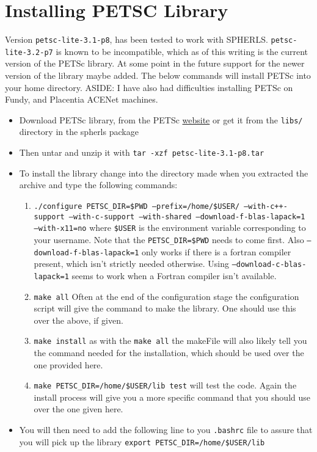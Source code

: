 \documentclass[12pt,a4paper]{book}
\begin{document}
\section{Installing PETSC Library}
Version {\tt petsc-lite-3.1-p8}, has been tested to work with SPHERLS. {\tt petsc-lite-3.2-p7} is known to be incompatible, which as of this writing is the current version of the PETSc library. At some point in the future support for the newer version of the library maybe added. The below commands will install PETSc into your home directory. ASIDE: I have also had difficulties installing PETSc on Fundy, and Placentia ACENet machines.

\begin{itemize}
\item Download PETSc library, from the PETSc \href{http://www.mcs.anl.gov/petsc/download/index.html}{website} or get it from the {\tt libs/} directory in the spherls package
\item Then untar and unzip it with {\tt tar -xzf petsc-lite-3.1-p8.tar}
\item To install the library change into the directory made when you extracted the archive and type the following commands:
\begin{enumerate}
\item {\tt ./configure PETSC\_DIR=\$PWD --prefix=/home/\$USER/ --with-c++-support --with-c-support --with-shared --download-f-blas-lapack=1 --with-x11=no} where {\tt \$USER} is the environment variable corresponding to your username.  Note that the {\tt PETSC\_DIR=\$PWD} needs to come first. Also {\tt --download-f-blas-lapack=1} only works if there is a fortran compiler present, which isn't strictly needed otherwise. Using {\tt --download-c-blas-lapack=1} seems to work when a Fortran compiler isn't available.
\item {\tt make all} Often at the end of the configuration stage the configuration script will give the command to make the library. One should use this over the above, if given.
\item {\tt make install} as with the {\tt make all} the makeFile will also likely tell you the command needed for the installation, which should be used over the one provided here.
\item {\tt make PETSC\_DIR=/home/\$USER/lib test} will test the code. Again the install process will give you a more specific command that you should use over the one given here.
\end{enumerate}
\item You will then need to add the following line to you {\tt .bashrc} file to assure that you will pick up the library {\tt export PETSC\_DIR=/home/\$USER/lib}
\end{itemize}
\end{document}
